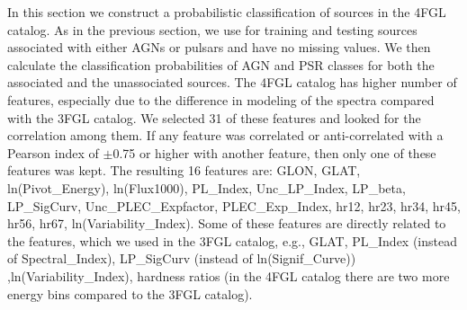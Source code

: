 In this section we construct a probabilistic classification of sources in the 4FGL catalog.
As in the previous section, we use for training and testing sources associated with either AGNs or pulsars and have no missing values.
We then calculate the classification probabilities of AGN and PSR classes for both the associated and the unassociated sources.
The 4FGL catalog has higher number of features, especially due to the difference in modeling of the spectra compared with the 3FGL catalog. 
We selected 31 of these features and looked for the correlation among them. If any feature was correlated or anti-correlated with a Pearson index of $\pm$0.75 or higher with another feature, then only one of these features was kept. 
The resulting 16 features are:
GLON, GLAT, ln(Pivot\_Energy), ln(Flux1000), PL\_Index, Unc\_LP\_Index, LP\_beta, LP\_SigCurv, Unc\_PLEC\_Expfactor, PLEC\_Exp\_Index, hr12, hr23, hr34, hr45, hr56, hr67, ln(Variability\_Index).
Some of these features are directly related to the features, which we used in the 3FGL catalog,
e.g., GLAT, PL\_Index (instead of Spectral\_Index), LP\_SigCurv (instead of ln(Signif\_Curve)) 
,ln(Variability\_Index), hardness ratios (in the 4FGL catalog there are two more energy bins compared to the 3FGL catalog).

